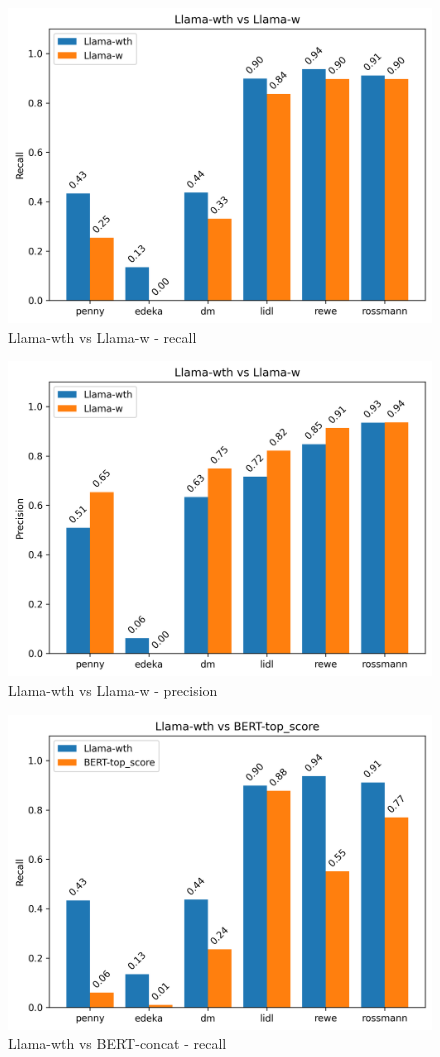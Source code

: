\documentclass[licencjacka,en]{pracamgr}
\begin{document}
\begin{appendices}
\begin{figure}[ht]
    \centering
    \includegraphics[width=0.8\linewidth]{bachelor_images/benchmark/llama_wth_vs_w_recall.png}
    \caption{Llama-wth vs Llama-w - recall}
    \label{fig:llama_wth_vs_w_recall}
\end{figure}

\begin{figure}[ht]
    \centering
    \includegraphics[width=0.8\linewidth]{bachelor_images/benchmark/llama_wth_vs_w_precision.png}
    \caption{Llama-wth vs Llama-w - precision}
    \label{fig:llama_wth_vs_w_precision}
\end{figure}

\begin{figure}[ht]
    \centering
    \includegraphics[width=0.8\linewidth]{bachelor_images/benchmark/llama_vs_bert_recall.png}
    \caption{Llama-wth vs BERT-concat - recall}
    \label{fig:llama_vs_bert_recall}
\end{figure}


\end{appendices}
\end{document}
